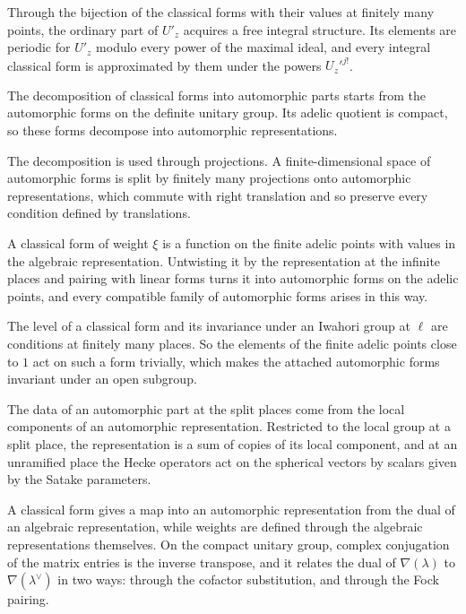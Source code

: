 Through the bijection of the classical forms with their values at finitely many points, the ordinary part of $U'_z$ acquires a free integral structure. Its elements are periodic for $U'_z$ modulo every power of the maximal ideal, and every integral classical form is approximated by them under the powers $U_z'^{j!}$.

The decomposition of classical forms into automorphic parts starts from the automorphic forms on the definite unitary group. Its adelic quotient is compact, so these forms decompose into automorphic representations.

The decomposition is used through projections. A finite-dimensional space of automorphic forms is split by finitely many projections onto automorphic representations, which commute with right translation and so preserve every condition defined by translations.

A classical form of weight $\xi$ is a function on the finite adelic points with values in the algebraic representation. Untwisting it by the representation at the infinite places and pairing with linear forms turns it into automorphic forms on the adelic points, and every compatible family of automorphic forms arises in this way.

The level of a classical form and its invariance under an Iwahori group at $\ell$ are conditions at finitely many places. So the elements of the finite adelic points close to $1$ act on such a form trivially, which makes the attached automorphic forms invariant under an open subgroup.

The data of an automorphic part at the split places come from the local components of an automorphic representation. Restricted to the local group at a split place, the representation is a sum of copies of its local component, and at an unramified place the Hecke operators act on the spherical vectors by scalars given by the Satake parameters.

A classical form gives a map into an automorphic representation from the dual of an algebraic representation, while weights are defined through the algebraic representations themselves. On the compact unitary group, complex conjugation of the matrix entries is the inverse transpose, and it relates the dual of $\nabla(\lambda)$ to $\nabla(\lambda^\vee)$ in two ways: through the cofactor substitution, and through the Fock pairing.

